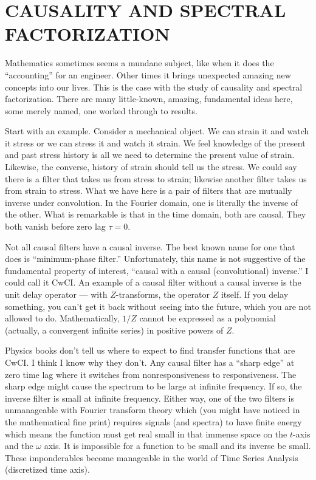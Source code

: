 \section{CAUSALITY AND SPECTRAL FACTORIZATION}

Mathematics sometimes seems a mundane subject,
like when it does the ``accounting'' for an engineer.
Other times it brings unexpected amazing new concepts into our lives.
This is the case with the study of causality and spectral factorization.
There are many little-known, amazing, fundamental ideas here,
some merely named, one worked through to results.

\par
Start with an example.  Consider a mechanical object.
We can strain it and watch it stress or we can stress it and watch it strain.
We feel knowledge of the present and past stress history is all we need
to determine the present value of strain.
Likewise, the converse, history of strain should tell us the stress.
We could say there is a filter that takes us from stress to strain;
likewise another filter takes us from strain to stress.
What we have here is a pair of filters that are mutually inverse
under convolution.
In the Fourier domain, one is literally the inverse of the other.
What is remarkable is that in the time domain, both are causal.
They both vanish before zero lag $\tau=0$.

\par
Not all causal filters have a causal inverse.
The best known name for one that does is ``minimum-phase filter.''
Unfortunately, this name is not suggestive of
the fundamental property of interest,
``causal with a causal (convolutional) inverse.''
I could call it CwCI.
An example of a causal filter without a causal inverse is the unit
delay operator --- with $Z$-transforms, the operator $Z$ itself.
If you delay something, you can't get it back without seeing into the future,
which you are not allowed to do.
Mathematically, $1/Z$ cannot be expressed as a polynomial
(actually, a convergent infinite series) in positive powers of $Z$.

\par
Physics books don't tell us where to expect to find
transfer functions that are CwCI.
I think I know why they don't.
Any causal filter has a ``sharp edge'' at zero time lag where it switches
from nonresponsiveness to responsiveness.
The sharp edge might cause the spectrum to be large at infinite frequency.
If so, the inverse filter is small at infinite frequency.
Either way,
one of the two filters is unmanageable with Fourier transform theory
which
(you might have noticed in the mathematical fine print)
requires signals (and spectra) to have finite energy
which means the function must get real small in that immense space
on the $t$-axis and the $\omega$ axis.
It is impossible for a function to be small and its inverse be small.
These imponderables become manageable in the world of Time Series Analysis
(discretized time axis).

